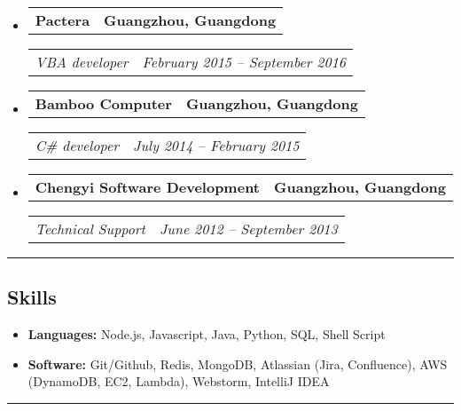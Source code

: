\documentclass[11pt,letterpaper]{article}
\makeatletter
\newcommand{\headerrow}[2]
{\begin{tabular*}{\linewidth}{l@{\extracolsep{\fill}}r}
#1 &
#2 \\
\end{tabular*}}
\makeatother
\begin{document}
\begin{itemize}[leftmargin=1em]
	\item
	      \headerrow
	      {\textbf{Pactera}}
	      {\textbf{Guangzhou, Guangdong}}
	      \headerrow
	      {\emph{VBA developer}}
	      {\emph{February 2015 -- September 2016}}
    \item
	      \headerrow
	      {\textbf{Bamboo Computer}}
	      {\textbf{Guangzhou, Guangdong}}
	      \headerrow
	      {\emph{C\# developer}}
	      {\emph{July 2014 -- February 2015}}
    \item
	      \headerrow
	      {\textbf{Chengyi Software Development}}
	      {\textbf{Guangzhou, Guangdong}}
	      \headerrow
	      {\emph{Technical Support}}
	      {\emph{June 2012 -- September 2013}}
	      	      
\end{itemize}

\hrule
\vspace{-1em}
\subsection*{\Large Skills}

\begin{itemize}[leftmargin=1em,noitemsep]
	\item \textbf{Languages:}
	      Node.js, Javascript, Java, Python, SQL, Shell Script
	\item \textbf{Software:}
	      Git/Github, Redis, MongoDB, Atlassian (Jira, Confluence), AWS (DynamoDB, EC2, Lambda), Webstorm, IntelliJ IDEA
\end{itemize}

\hrule
\vspace{-1em}
\end{document}
